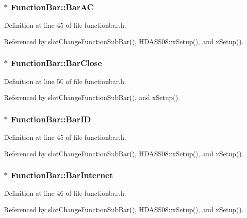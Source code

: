 \subsubsection{$\ast$ {\bf Function\-Bar::Bar\-AC}}\label{classFunctionBar_FunctionBaro0}




Definition at line 45 of file functionbar.h.

Referenced by slot\-Change\-Function\-Sub\-Bar(), HDASS08::x\-Setup(), and x\-Setup().
\subsubsection{$\ast$ {\bf Function\-Bar::Bar\-Close}}\label{classFunctionBar_FunctionBaro6}




Definition at line 50 of file functionbar.h.

Referenced by slot\-Change\-Function\-Sub\-Bar(), and x\-Setup().
\subsubsection{ $\ast$ {\bf Function\-Bar::Bar\-ID}}\label{classFunctionBar_FunctionBaro1}




Definition at line 45 of file functionbar.h.

Referenced by slot\-Change\-Function\-Sub\-Bar(), HDASS08::x\-Setup(), and x\-Setup().
\subsubsection{$\ast$ {\bf Function\-Bar::Bar\-Internet}}\label{classFunctionBar_FunctionBaro2}




Definition at line 46 of file functionbar.h.

Referenced by slot\-Change\-Function\-Sub\-Bar(), HDASS08::x\-Setup(), and x\-Setup().
